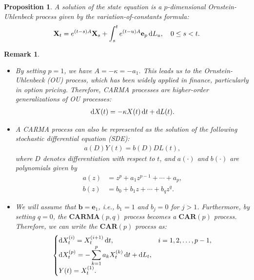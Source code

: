\documentclass[10pt,a4paper,reqno]{amsart}
\newtheorem{remark}[theorem]{Remark}
\newtheorem{proposition}[theorem]{Proposition}
\theoremstyle{example}
\newcommand*\D{\mathop{}\!\textnormal{d}}
\begin{document}
\begin{proposition}\label{prop:variation-of-constant}
A solution of the state equation is a $p$-dimensional Ornstein-Uhlenbeck process
given by the variation-of-constants formula: 
\begin{align}
    \mathbf{X}_t = e^{(t-s)A} \mathbf{X}_s + \int_s^t e^{(t-u)A} \mathbf{e}_p \D
  L_u, \quad 0 \leq s < t. 
\end{align}
\end{proposition}

\begin{remark}
\begin{itemize}
    \item By setting $p = 1$, we have $A = -\kappa = -a_1$. This leads us to the
      Ornstein-Uhlenbeck (OU) process, which has been widely applied in finance,
      particularly in option pricing. Therefore, CARMA processes are
      higher-order generalizations of OU processes: 
    \begin{align*}
        \D X(t) = -\kappa X(t) \D t + \D L(t). 
    \end{align*}
    \item A CARMA process can also be represented as the solution of the following stochastic differential equation (SDE):
    \begin{align*}
        a(D) Y(t) = b(D) D L(t),
    \end{align*}
    where $D$ denotes differentiation with respect to $t$, and $a(\cdot)$ and $b(\cdot)$ are polynomials given by
    \begin{align*}
        a(z) &= z^p + a_1 z^{p-1} + \cdots + a_p, \\
        b(z) &= b_0 + b_1 z + \cdots + b_q z^q.
    \end{align*}
    \item We will assume that $\mathbf{b} = \mathbf{e}_1$, i.e., $b_1 = 1$ and
      $b_j = 0$ for $j > 1$. Furthermore, by setting $q = 0$, the
      $\mathbf{CARMA}(p,q)$ process becomes a $\mathbf{CAR}(p)$
      process. Therefore, we can write the $\mathbf{CAR}(p)$ process as: 
    \begin{align*}
    \begin{cases}
    \D X_t^{(i)} = X_t^{(i+1)} \D t, & i = 1, 2, \dots, p-1, \\
    \D X_t^{(p)} = -\displaystyle\sum_{k=1}^p a_k X_t^{(k)} \D t + \D L_t, & \\
    Y(t) = X_t^{(1)}. &
    \end{cases}
    \end{align*}
\end{itemize}
\end{remark}
\end{document}

